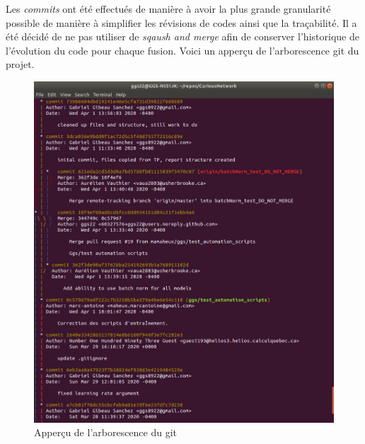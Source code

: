 Les \textit{commits} ont été effectués de manière à avoir la plus grande granularité possible de manière à simplifier les révisions de codes ainsi que la traçabilité. Il a été décidé de ne pas utiliser de \textit{sqaush and merge} afin de conserver l'historique de l'évolution du code pour chaque fusion. Voici un apperçu de l'arborescence git du projet.
    \begin{figure}[H]
        \centering
        \includegraphics[width=15cm]{images/git_graph.png}
        \caption{Apperçu de l'arborescence du git}
        \label{fig:git_graph}
    \end{figure}